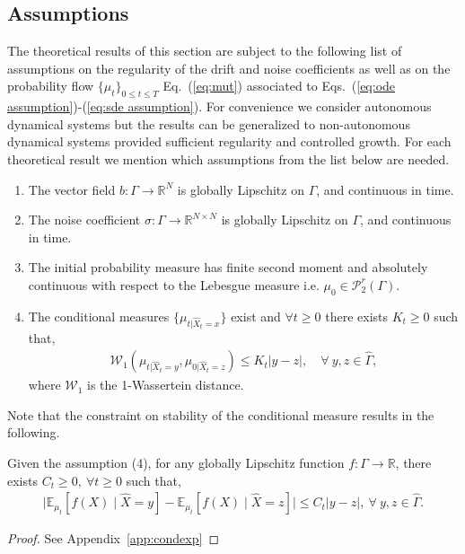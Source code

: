 \documentclass[11pt, a4paper, oneside, reqno]{amsart}
\begin{document}
\subsection{Assumptions}\label{sec:assumptions}
\noindent The theoretical results of this section are subject to the following list of assumptions on the regularity of the drift and noise coefficients as well as on the probability flow $\{\mu_t\}_{0\leq t\leq T}$ Eq.~(\ref{eq:mut}) associated to Eqs.~(\ref{eq:ode assumption})-(\ref{eq:sde assumption}). 
For convenience we consider autonomous dynamical systems but the results can be generalized to non-autonomous dynamical systems provided sufficient regularity and controlled growth. 
For each theoretical result we mention which assumptions from the list below are needed.
\begin{enumerate}
    \item The vector field $b:\Gamma \to\mathbb{R}^N$ is globally Lipschitz on $\Gamma$, and continuous in time. 
    \item The noise coefficient $\sigma:\Gamma\to\mathbb{R}^{N\times N}$ is globally Lipschitz on $\Gamma$, and continuous in time. 
    \item The initial probability measure has finite second moment and absolutely continuous with respect to the Lebesgue measure i.e. $\mu_0\in\mathcal{P}^r_2(\Gamma)$.
    \item The conditional measures $\{\mu_{t|\hat{X}_t=x}\}$ exist and $\forall t\geq 0$ there exists $K_t\geq 0$ such that,
    \begin{eqnarray}
    \mathcal{W}_1(\mu_{t|\hat{X}_t=y},\mu_{0|\hat{X}_t=z})\leq K_t|y-z|, \quad \forall \ y,z \in \hat{\Gamma},
    \end{eqnarray}
    where $\mathcal{W}_1$ is the 1-Wassertein distance. 
\end{enumerate}
Note that the constraint on stability of the conditional measure results in the following. 
\begin{proposition}\label{prop:lipschitz mckean-vlasov}
Given the assumption (4), for any globally Lipschitz function $f:\Gamma\to\mathbb{R}$, there exists $C_t\geq 0, \ \forall t\geq0$ such that,  
\begin{eqnarray}
        \big|\mathbb{E}_{\mu_t}[f(X)\mid \hat{X}=y] - \mathbb{E}_{\mu_t}[f(X)\mid \hat{X}=z]\big|\leq C_t|y-z|,\: \forall \ y,z\in\hat{\Gamma}.
\end{eqnarray}
\end{proposition}
\begin{proof}
    See Appendix~\ref{app:condexp}
\end{proof}
\end{document}
